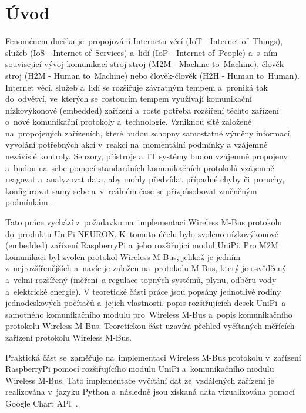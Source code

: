 \chapter*{Úvod}
{}

Fenoménem dneška je~propojování Internetu věcí (IoT - Internet of~Things), služeb (IoS - Internet of~Services) a~lidí (IoP - Internet of~People) a~s~ním související vývoj komunikací stroj-stroj (M2M - Machine to~Machine), člověk-stroj (H2M - Human to~Machine) nebo člověk-člověk (H2H - Human to~Human). Internet věcí, služeb a~lidí se rozšiřuje závratným tempem a~proniká tak do~odvětví, ve~kterých se~rostoucím tempem využívají komunikační nízkovýkonové (embedded) zařízení a~roste potřeba rozšíření těchto zařízení o~nové komunikační protokoly a~technologie. Vzniknou sítě založené na~propojených zařízeních, které budou schopny samostatné výměny informací, vyvolání potřebných akcí v~reakci na~momentální podmínky a vzájemné nezávislé kontroly. Senzory, přístroje a~IT systémy budou vzájemně propojeny a~budou na~sebe pomocí standardních komunikačních protokolů vzájemně reagovat a~analyzovat data, aby mohly předvídat případné chyby či~poruchy, konfigurovat samy sebe a~v~reálném čase se přizpůsobovat změněným 
podmínkám \cite{uvod_prumysl_4_pdf,uvod_prumysl_4_web}.

Tato práce vychází z~požadavku na~implementaci Wireless M-Bus protokolu do~produktu UniPi NEURON. K~tomuto účelu bylo zvoleno nízkovýkonové (embedded) zařízení RaspberryPi a~jeho rozšiřující modul UniPi. Pro M2M komunikaci byl zvolen protokol Wireless M-Bus, jelikož je jedním z~nejrozšířenějších a~navíc je založen na~protokolu M-Bus, který je osvědčený a~velmi rozšířený (měření~a regulace topných systémů, plynu, odběru vody a~elektrické energie). V teoretické části práce jsou popsány jednotlivé rodiny jednodeskových počítačů a~jejich vlastnosti, popis rozšiřujících desek UniPi~a samotného komunikačního modulu pro~Wireless M-Bus a~popis komunikačního protokolu Wireless M-Bus. Teoretickou část uzavírá přehled vyčítaných měřících zařízení protokolu Wireless M-Bus. 

Praktická část se~zaměřuje na~implementaci Wireless M-Bus protokolu v~zařízení RaspberryPi pomocí rozšiřujícího modulu UniPi a~komunikačního modulu Wireless M-Bus. Tato implementace vyčítání dat ze~vzdálených zařízení je realizována v~jazyku Python a~následně jsou získaná data vizualizována pomocí Google Chart API~\cite{uvod_google_charts_api}.


 